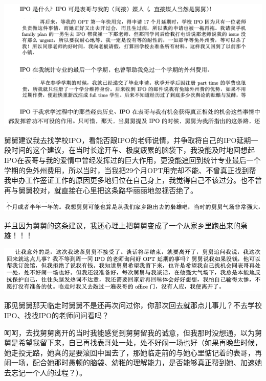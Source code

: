 \documentclass[9pt, b5paper]{article}
\begin{document}
\begin{center}
\includegraphics[width=.9\linewidth]{./pic/backups_plans_20210416_074042.png}
\end{center}

舅舅建议我去找学校IPO，看能否跟IPO的老师说情，并争取将自己的IPO延期一段时间的这个建议，在当时长途开车、极度疲累的脑袋下，我没能及时地回想起IPO在表哥与我的爱情中曾经发挥过的巨大作用，更没能追回到统计专业最后一个学期的免外州费用，所以当时，当我把29个月OPT用完却不能、不曾真正找到帮我申办工作签证工作的原因更多地归位在自己身上，我觉得自己不该过分。也不曾再与舅舅校对，就直接在心里把这条路华丽丽地忽视否绝了。 

\begin{center}
\includegraphics[width=.9\linewidth]{./pic/backups_plans_20210416_074428.png}
\end{center}

并且因为舅舅的这条建议，我还心理上把舅舅变成了一个从家乡里跑出来的枭雄！！！

\begin{center}
\includegraphics[width=.9\linewidth]{./pic/backups_plans_20210416_074805.png}
\end{center}

那见舅舅那天临走时舅舅不是还再次问过你，你那次回去就那点儿事儿？不去学校IPO、找找IPO的老师问问看吗？

呵呵，去找舅舅离开的当时我能感觉到舅舅留我的诚意，但我那时没想通，以为舅舅是希望我留下来，自已再找表哥处一处，处不好闹一场也好（如果再晚些时候，她走投无路，她真的是要滚回中国去了，那她临走前的与她心里惦记着的表哥，再闹一场，配合她那时愚顿的脑袋、幼稚的理解能力，是否能够真正帮到她、加速她去忘记一个人的过程？）。
\end{document}
